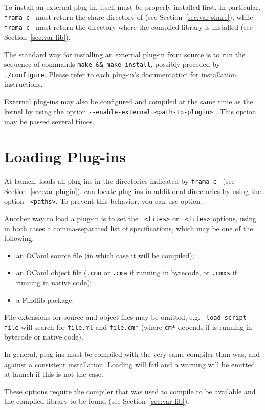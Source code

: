 To install an external plug-in, \FramaC itself must be properly installed
first. In particular, \texttt{frama-c }
must return the share directory of \FramaC (see Section~\ref{sec:var-share}),
while \texttt{frama-c }
must return the directory where the \FramaC compiled library is installed (see
Section~\ref{sec:var-lib}).

The standard way for installing an external plug-in from source is to run the
sequence of commands \texttt{make \&\& make install}, possibly preceded by
\texttt{./configure}. Please refer to each
plug-in's documentation for installation instructions.

External plug-ins may also be configured and compiled at the same time as
the \FramaC kernel by using the option
\texttt{-{}-enable-external=<path-to-plugin>}
. This option may be passed several times.

\section{Loading Plug-ins}\label{sec:use-plugins}

At launch, \FramaC loads all plug-ins in the
directories indicated by \texttt{frama-c } (see
Section~\ref{sec:var-plugin}). \FramaC can locate plug-ins in additional
directories by using the option \texttt{ <paths>}.
To prevent this behavior, you can use option
.

Another way to load a plug-in is to set the
\texttt{ <files>} or
\texttt{ <files>} options, using in both cases a
comma-separated list of specifications, which may be one of the following:

\begin{itemize}
\item an OCaml source file (in which case it will be compiled);
\item an OCaml object file (\texttt{.cmo} or \texttt{.cma} if running
  \FramaC in bytecode, or \texttt{.cmxs} if running \FramaC in native code);
\item a Findlib package.
\end{itemize}

File extensions for source and object files may be omitted, e.g.
\texttt{-load-script file} will search for \texttt{file.ml} and
\texttt{file.cm*} (where \texttt{cm*} depends if \FramaC is running in
bytecode or native code).


\begin{important}
In general, plug-ins must be compiled with the
very same \caml compiler than \FramaC was, and against a consistent \FramaC
installation. Loading will fail and a warning will be emitted at launch if this
is not the case.

These options require the \caml compiler that was
used to compile \FramaC to be available and the \FramaC compiled library to be
found (see Section~\ref{sec:var-lib}).
\end{important}

